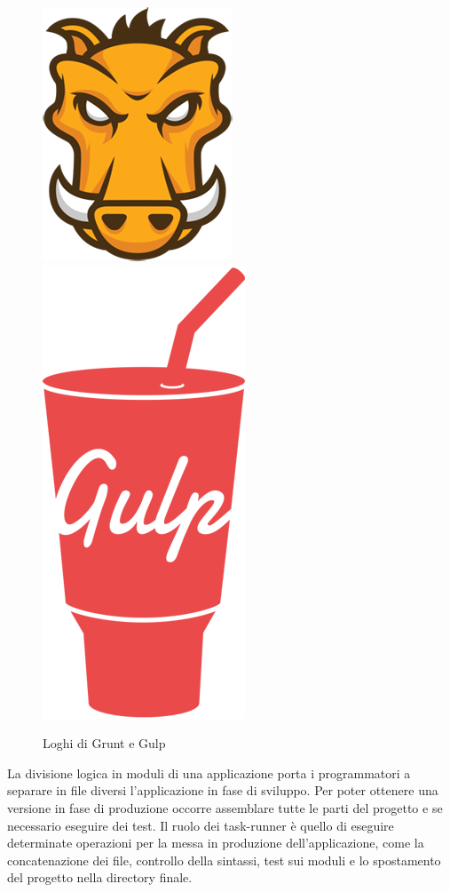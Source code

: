 \begin{figure}
  \vspace{-65pt}
  \begin{center}
    \includegraphics[scale=0.4]{Figures/grunt-logo.png}
	\includegraphics[scale=0.3]{Figures/gulp-logo.png}  
  \end{center}
  \vspace{-10pt}
  \caption{Loghi di Grunt e Gulp}
  \label{fig:task runner}
  \vspace{0pt}
\end{figure}

La divisione logica in moduli di una applicazione porta i programmatori a separare in file diversi l'applicazione in fase di sviluppo. Per poter ottenere una versione in fase di produzione occorre assemblare tutte le parti del progetto e se necessario eseguire dei test.
Il ruolo dei task-runner è quello di eseguire determinate operazioni per la messa in produzione dell'applicazione, come la concatenazione dei file, controllo della sintassi, test sui moduli e lo spostamento del progetto nella directory finale.

